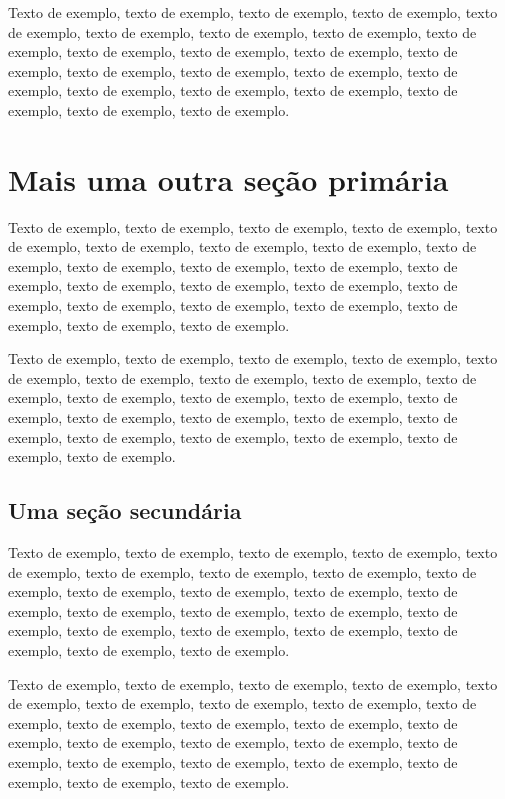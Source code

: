 \documentclass[
	12pt,				%
	oneside,			%
	a4paper,			%
	english,			%
	brazil				%
	]{abntex2ppgsi}
\begin{document}
Texto de exemplo, texto de exemplo, texto de exemplo, texto de exemplo, texto de exemplo, texto de exemplo, texto de exemplo, texto de exemplo, texto de exemplo, texto de exemplo, texto de exemplo, texto de exemplo, texto de exemplo, texto de exemplo, texto de exemplo, texto de exemplo, texto de exemplo, texto de exemplo, texto de exemplo, texto de exemplo, texto de exemplo, texto de exemplo, texto de exemplo.

\chapter{Mais uma outra seção primária}

Texto de exemplo, texto de exemplo, texto de exemplo, texto de exemplo, texto de exemplo, texto de exemplo, texto de exemplo, texto de exemplo, texto de exemplo, texto de exemplo, texto de exemplo, texto de exemplo, texto de exemplo, texto de exemplo, texto de exemplo, texto de exemplo, texto de exemplo, texto de exemplo, texto de exemplo, texto de exemplo, texto de exemplo, texto de exemplo, texto de exemplo.

Texto de exemplo, texto de exemplo, texto de exemplo, texto de exemplo, texto de exemplo, texto de exemplo, texto de exemplo, texto de exemplo, texto de exemplo, texto de exemplo, texto de exemplo, texto de exemplo, texto de exemplo, texto de exemplo, texto de exemplo, texto de exemplo, texto de exemplo, texto de exemplo, texto de exemplo, texto de exemplo, texto de exemplo, texto de exemplo.

\section{Uma seção secundária}

Texto de exemplo, texto de exemplo, texto de exemplo, texto de exemplo, texto de exemplo, texto de exemplo, texto de exemplo, texto de exemplo, texto de exemplo, texto de exemplo, texto de exemplo, texto de exemplo, texto de exemplo, texto de exemplo, texto de exemplo, texto de exemplo, texto de exemplo, texto de exemplo, texto de exemplo, texto de exemplo, texto de exemplo, texto de exemplo, texto de exemplo.

Texto de exemplo, texto de exemplo, texto de exemplo, texto de exemplo, texto de exemplo, texto de exemplo, texto de exemplo, texto de exemplo, texto de exemplo, texto de exemplo, texto de exemplo, texto de exemplo, texto de exemplo, texto de exemplo, texto de exemplo, texto de exemplo, texto de exemplo, texto de exemplo, texto de exemplo, texto de exemplo, texto de exemplo, texto de exemplo, texto de exemplo.
\end{document}
